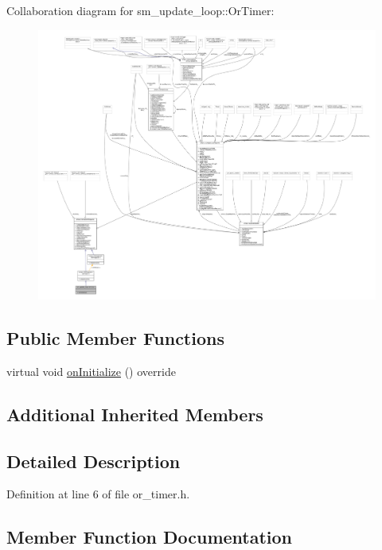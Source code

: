 Collaboration diagram for sm\+\_\+update\+\_\+loop\+:\+:Or\+Timer\+:
\nopagebreak
\begin{figure}[H]
\begin{center}
\leavevmode
\includegraphics[width=350pt]{classsm__update__loop_1_1OrTimer__coll__graph}
\end{center}
\end{figure}
\subsection*{Public Member Functions}
\begin{DoxyCompactItemize}
\item 
virtual void \hyperlink{classsm__update__loop_1_1OrTimer_af2b4637bc236bcaada12b703c5f0a110}{on\+Initialize} () override
\end{DoxyCompactItemize}
\subsection*{Additional Inherited Members}


\subsection{Detailed Description}


Definition at line 6 of file or\+\_\+timer.\+h.



\subsection{Member Function Documentation}
\mbox{\label{classsm__update__loop_1_1OrTimer_af2b4637bc236bcaada12b703c5f0a110}} 
